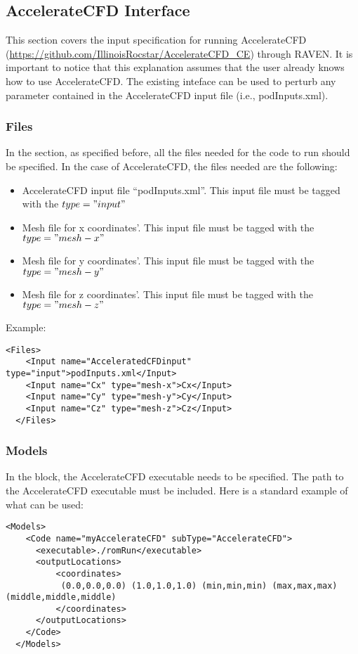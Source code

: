\subsection{AccelerateCFD Interface}
\label{subsec:AccelerateCFDInterface}
This section covers the input specification for running AccelerateCFD
 (\url{https://github.com/IllinoisRocstar/AccelerateCFD_CE})
 through RAVEN. It is important to notice
that this explanation assumes that the user already knows how to use AccelerateCFD. The existing inteface can be used to perturb any parameter
contained in the AccelerateCFD input file (i.e., podInputs.xml).

\subsubsection{Files}
In the  section, as specified before, all the files needed
for the code to run should be specified. In the case of AccelerateCFD,
the files needed are the following:
\begin{itemize}
  \item AccelerateCFD input file ``podInputs.xml''. This input file must be tagged with
          the $type="input"$
  \item Mesh file for x coordinates'. This input file must be tagged with
          the $type="mesh-x"$
  \item Mesh file for y coordinates'. This input file must be tagged with
          the $type="mesh-y"$
  \item Mesh file for z coordinates'. This input file must be tagged with
          the $type="mesh-z"$
\end{itemize}
%
Example:
\begin{lstlisting}[style=XML]
  <Files>
    <Input name="AcceleratedCFDinput" type="input">podInputs.xml</Input>
    <Input name="Cx" type="mesh-x">Cx</Input>
    <Input name="Cy" type="mesh-y">Cy</Input>
    <Input name="Cz" type="mesh-z">Cz</Input>
  </Files>
\end{lstlisting}

\subsubsection{Models}
In the  block, the AccelerateCFD executable needs to be specified.
The  path to the AccelerateCFD executable must be included.
Here is a standard example of what can be used:
\begin{lstlisting}[style=XML]
  <Models>
    <Code name="myAccelerateCFD" subType="AccelerateCFD">
      <executable>./romRun</executable>
      <outputLocations>
          <coordinates>
           (0.0,0.0,0.0) (1.0,1.0,1.0) (min,min,min) (max,max,max) (middle,middle,middle)
          </coordinates>
      </outputLocations>
    </Code>
  </Models>
\end{lstlisting}


